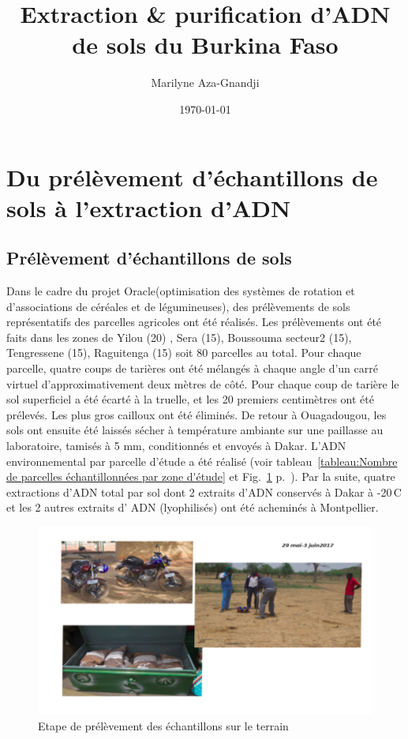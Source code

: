 \documentclass[a4paper,11pt]{article}
\begin{document}
\title{Extraction \& purification d'ADN de sols du Burkina Faso}
\author{Marilyne Aza-Gnandji} \date{\today}

\maketitle \tableofcontents
\newpage

\section{Du prélèvement d'échantillons de sols à l'extraction d'ADN}


\subsection{Prélèvement d'échantillons de sols}

Dans le cadre du projet Oracle(optimisation des systèmes de rotation
et d’associations de céréales et de légumineuses), des prélèvements de
sols représentatifs des parcelles agricoles ont été réalisés. Les
prélèvements ont été faits dans les zones de Yilou (20) , Sera (15),
Boussouma secteur2 (15), Tengressene (15), Raguitenga (15) soit 80
parcelles au total. Pour chaque parcelle, quatre coups de tarières ont
été mélangés à chaque angle d’un carré virtuel d’approximativement
deux mètres de côté. Pour chaque coup de tarière le sol superficiel a
été écarté à la truelle, et les 20 premiers centimètres ont été
prélevés. Les plus \og{}gros cailloux\fg{} ont été éliminés.  De
retour à Ouagadougou, les sols ont ensuite été laissés sécher à
température ambiante sur une paillasse au laboratoire, tamisés à 5 mm,
conditionnés et envoyés à Dakar. L'ADN environnemental par parcelle
d’étude a été réalisé (voir tableau~\ref{tableau:Nombre de parcelles
  échantillonnées par zone d'étude} et Fig.~\ref{fig-image1}
p.~\pageref{fig-image1}).  Par la suite, quatre extractions d'ADN
total par sol dont 2 extraits d’ADN conservés à Dakar à
-20\,\degree{}C et les 2 autres extraits d' ADN (lyophilisés) ont été
acheminés à Montpellier.


\begin{figure}
  \begin{center}
    \includegraphics[width=16cm]{images/image1}
  \end{center}
  \caption{Etape de prélèvement des échantillons sur le terrain}
  \label{fig-image1}
\end{figure}
\end{document}
